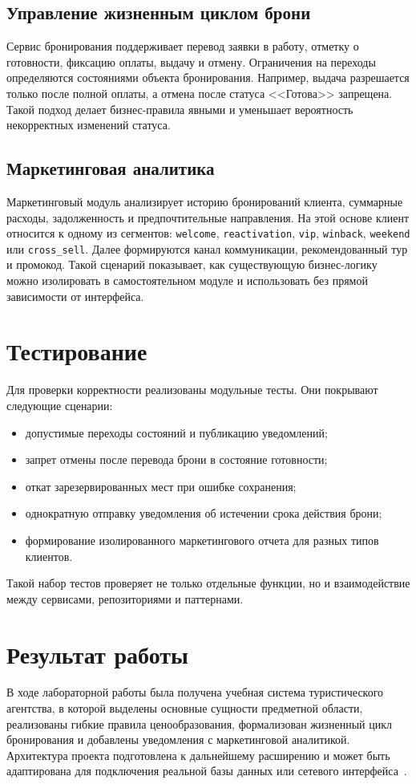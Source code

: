 \subsection{Управление жизненным циклом брони}

Сервис бронирования поддерживает перевод заявки в работу, отметку о готовности,
фиксацию оплаты, выдачу и отмену. Ограничения на переходы определяются
состояниями объекта бронирования. Например, выдача разрешается только после
полной оплаты, а отмена после статуса <<Готова>> запрещена. Такой подход
делает бизнес-правила явными и уменьшает вероятность некорректных изменений
статуса.

\subsection{Маркетинговая аналитика}

Маркетинговый модуль анализирует историю бронирований клиента, суммарные
расходы, задолженность и предпочтительные направления. На этой основе клиент
относится к одному из сегментов: \texttt{welcome}, \texttt{reactivation},
\texttt{vip}, \texttt{winback}, \texttt{weekend} или \texttt{cross\_sell}.
Далее формируются канал коммуникации, рекомендованный тур и промокод. Такой
сценарий показывает, как существующую бизнес-логику можно изолировать в
самостоятельном модуле и использовать без прямой зависимости от интерфейса.

\section{Тестирование}

Для проверки корректности реализованы модульные тесты. Они покрывают следующие
сценарии:

\begin{itemize}
    \item допустимые переходы состояний и публикацию уведомлений;
    \item запрет отмены после перевода брони в состояние готовности;
    \item откат зарезервированных мест при ошибке сохранения;
    \item однократную отправку уведомления об истечении срока действия брони;
    \item формирование изолированного маркетингового отчета для разных типов клиентов.
\end{itemize}

Такой набор тестов проверяет не только отдельные функции, но и взаимодействие
между сервисами, репозиториями и паттернами.

\section{Результат работы}

В ходе лабораторной работы была получена учебная система туристического
агентства, в которой выделены основные сущности предметной области, реализованы
гибкие правила ценообразования, формализован жизненный цикл бронирования и
добавлены уведомления с маркетинговой аналитикой. Архитектура проекта
подготовлена к дальнейшему расширению и может быть адаптирована для подключения
реальной базы данных или сетевого интерфейса~\cite{python312}.
